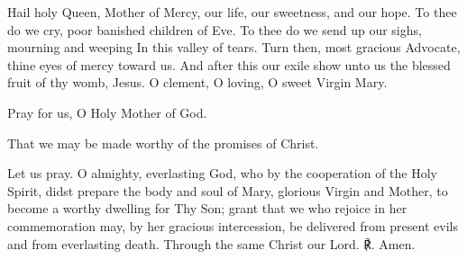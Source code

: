 \begin{enpars}\noindent Hail holy Queen, Mother of Mercy, 
our life, our sweetness, and our hope. 
To thee do we cry, poor banished children of Eve. 
To thee do we send up our sighs, mourning and weeping 
In this valley of tears. Turn then, most gracious Advocate, 
thine eyes of mercy toward us. 
And after this our exile show unto us 
the blessed fruit of thy womb, Jesus.
O clement, O loving, O sweet Virgin Mary.

\noindent \vv Pray for us, O Holy Mother of God.

\noindent \rr \hspace{-0.02em}That we may be made worthy of the promises of Christ.

\noindent Let us pray. O almighty, everlasting God, who by the cooperation of the Holy Spirit, didst prepare the body and soul of Mary, glorious Virgin and Mother, to become a worthy dwelling for Thy Son; grant that we who rejoice in her commemoration may, by her gracious intercession, be delivered from present evils and from everlasting death. Through the same Christ our Lord. ℟. Amen.
\end{enpars}